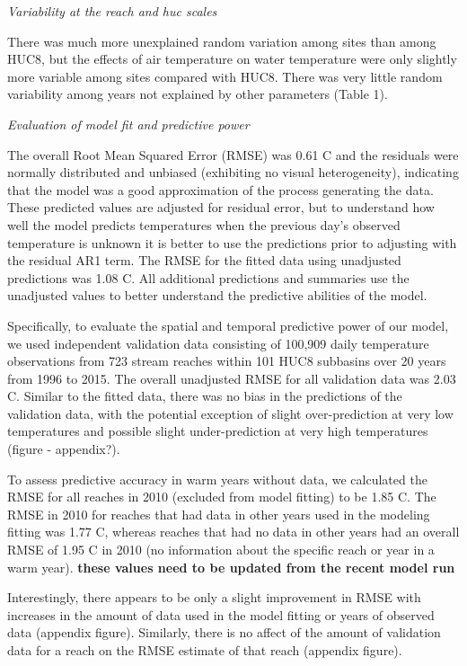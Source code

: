 \documentclass[]{article}
\begin{document}
\emph{Variability at the reach and huc scales}

There was much more unexplained random variation among sites than among
HUC8, but the effects of air temperature on water temperature were only
slightly more variable among sites compared with HUC8. There was very
little random variability among years not explained by other parameters
(Table 1).

\emph{Evaluation of model fit and predictive power}

The overall Root Mean Squared Error (RMSE) was 0.61 C and the residuals
were normally distributed and unbiased (exhibiting no visual
heterogeneity), indicating that the model was a good approximation of
the process generating the data. These predicted values are adjusted for
residual error, but to understand how well the model predicts
temperatures when the previous day's observed temperature is unknown it
is better to use the predictions prior to adjusting with the residual
AR1 term. The RMSE for the fitted data using unadjusted predictions was
1.08 C. All additional predictions and summaries use the unadjusted
values to better understand the predictive abilities of the model.

Specifically, to evaluate the spatial and temporal predictive power of
our model, we used independent validation data consisting of 100,909
daily temperature observations from 723 stream reaches within 101 HUC8
subbasins over 20 years from 1996 to 2015. The overall unadjusted RMSE
for all validation data was 2.03 C. Similar to the fitted data, there
was no bias in the predictions of the validation data, with the
potential exception of slight over-prediction at very low temperatures
and possible slight under-prediction at very high temperatures (figure -
appendix?).

To assess predictive accuracy in warm years without data, we calculated
the RMSE for all reaches in 2010 (excluded from model fitting) to be
1.85 C. The RMSE in 2010 for reaches that had data in other years used
in the modeling fitting was 1.77 C, whereas reaches that had no data in
other years had an overall RMSE of 1.95 C in 2010 (no information about
the specific reach or year in a warm year). \textbf{these values need to
be updated from the recent model run}

Interestingly, there appears to be only a slight improvement in RMSE
with increases in the amount of data used in the model fitting or years
of observed data (appendix figure). Similarly, there is no affect of the
amount of validation data for a reach on the RMSE estimate of that reach
(appendix figure).
\end{document}
